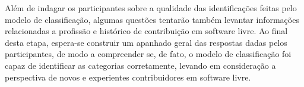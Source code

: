 Além de indagar os participantes sobre a qualidade das identificações feitas pelo modelo de classificação, algumas questões tentarão também levantar informações relacionadas a profissão e histórico de contribuição em software livre. Ao final desta etapa, espera-se construir um apanhado geral das respostas dadas pelos participantes, de modo a compreender se, de fato, o modelo de classificação foi capaz de identificar as categorias corretamente, levando em consideração a perspectiva de novos e experientes contribuidores em software livre.
